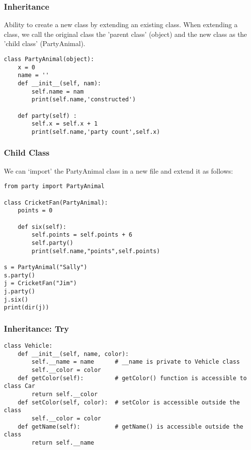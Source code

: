 \begin{frame}[fragile]\frametitle{Inheritance}
Ability to create a new class by extending an existing class. When extending a class, we call the
original class the 'parent class' (object) and the new class as the 'child class' (PartyAnimal).
\begin{lstlisting}
class PartyAnimal(object):
	x = 0
	name = ''
	def __init__(self, nam):
		self.name = nam
		print(self.name,'constructed')

	def party(self) :
		self.x = self.x + 1
		print(self.name,'party count',self.x)
\end{lstlisting}
\end{frame}


\begin{frame}[fragile]\frametitle{Child Class}
We can `import' the PartyAnimal class in a new file and extend it as follows:
\begin{lstlisting}
from party import PartyAnimal

class CricketFan(PartyAnimal):
	points = 0

	def six(self):
		self.points = self.points + 6
		self.party()
		print(self.name,"points",self.points)

s = PartyAnimal("Sally")
s.party()
j = CricketFan("Jim")
j.party()
j.six()
print(dir(j))	
\end{lstlisting}
\end{frame}

\begin{frame}[fragile]\frametitle{Inheritance: Try}

\begin{lstlisting}
class Vehicle:
    def __init__(self, name, color):
        self.__name = name      # __name is private to Vehicle class
        self.__color = color
    def getColor(self):         # getColor() function is accessible to class Car
        return self.__color
    def setColor(self, color):  # setColor is accessible outside the class
        self.__color = color
    def getName(self):          # getName() is accessible outside the class
        return self.__name
 
\end{lstlisting}
\end{frame}


